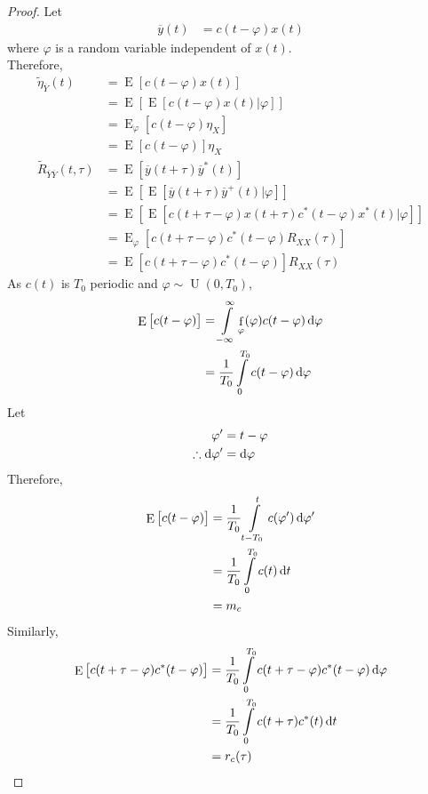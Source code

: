 \documentclass[titlepage, fleqn, a4paper, 12pt, twoside]{article}
\theoremstyle{definition}
\theoremstyle{theorem}
\renewcommand{\tilde}{\widetilde}
\DeclareMathOperator{\pdf}{\mathrm{f}}
\DeclareMathOperator{\expct}{\mathrm{E}}
\DeclareMathOperator{\uniform}{\mathrm{U}}
\begin{document}
\begin{proof}
	Let
	\begin{align*}
		\overline{y}(t) &= c(t - \varphi) x(t)
	\end{align*}
	where $\varphi$ is a random variable independent of $x(t)$.\\
	Therefore,
	\begin{align*}
		\tilde{\eta}_{\overline{Y}}(t) &= \expct\left[ c(t - \varphi) x(t) \right]\\
		&= \expct\left[ \expct\left[ c(t - \varphi) x(t) \Big| \varphi \right] \right]\\
		&= \expct_{\varphi}\left[ c(t - \varphi) \eta_X \right]\\
		&= \expct\left[ c(t - \varphi) \right] \eta_X\\
		\tilde{R}_{\overline{Y} \overline{Y}}(t,\tau) &= \expct\left[ \overline{y}(t + \tau) \overline{y}^*(t) \right]\\
		&= \expct\left[ \expct\left[ \overline{y}(t + \tau) \overline{y}^+(t) \Big| \varphi \right] \right]\\
		&= \expct\left[ \expct\left[ c(t + \tau - \varphi) x(t + \tau) c^*(t - \varphi) x^*(t) \Big| \varphi \right] \right]\\
		&= \expct_{\varphi}\left[ c(t + \tau - \varphi) c^*(t - \varphi) R_{X X}(\tau) \right]\\
		&= \expct\left[ c(t + \tau - \varphi) c^*(t - \varphi) \right] R_{X X}(\tau)
	\end{align*}
	As $c(t)$ is $T_0$ periodic and $\varphi \sim \uniform(0,T_0)$,
	\begin{align*}
		\expct\left[ c(t - \varphi) \right] &= \int\limits_{-\infty}^{\infty} \pdf_{\varphi}(\varphi) c(t - \varphi) \dif \varphi\\
		&= \frac{1}{T_0} \int\limits_{0}^{T_0} c(t - \varphi) \dif \varphi
	\end{align*}
	Let
	\begin{align*}
		\varphi' &= t - \varphi\\
		\therefore \dif \varphi' &= \dif \varphi
	\end{align*}
	Therefore,
	\begin{align*}
		\expct\left[ c(t - \varphi) \right] &= \frac{1}{T_0} \int\limits_{t - T_0}^{t} c(\varphi') \dif \varphi'\\
		&= \frac{1}{T_0} \int\limits_{0}^{T_0} c(t) \dif t\\
		&= m_c
	\end{align*}
	Similarly,
	\begin{align*}
		\expct\left[ c(t + \tau - \varphi) c^*(t - \varphi) \right] &= \frac{1}{T_0} \int\limits_{0}^{T_0} c(t + \tau - \varphi) c^*(t - \varphi) \dif \varphi\\
		&= \frac{1}{T_0} \int\limits_{0}^{T_0} c(t + \tau) c^*(t) \dif t\\
		&= r_c(\tau)
	\end{align*}
\end{proof}
\end{document}
